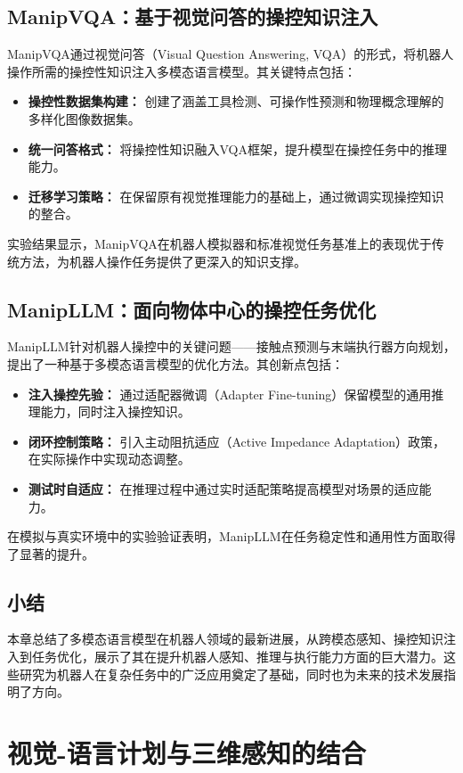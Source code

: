 \documentclass[a4paper]{article}
\begin{document}
\subsection{ManipVQA：基于视觉问答的操控知识注入}
ManipVQA通过视觉问答（Visual Question Answering, VQA）的形式，将机器人操作所需的操控性知识注入多模态语言模型。其关键特点包括：
\begin{itemize}
    \item \textbf{操控性数据集构建：} 创建了涵盖工具检测、可操作性预测和物理概念理解的多样化图像数据集。
    \item \textbf{统一问答格式：} 将操控性知识融入VQA框架，提升模型在操控任务中的推理能力。
    \item \textbf{迁移学习策略：} 在保留原有视觉推理能力的基础上，通过微调实现操控知识的整合。
\end{itemize}
实验结果显示，ManipVQA在机器人模拟器和标准视觉任务基准上的表现优于传统方法，为机器人操作任务提供了更深入的知识支撑。

\subsection{ManipLLM：面向物体中心的操控任务优化}
ManipLLM针对机器人操控中的关键问题——接触点预测与末端执行器方向规划，提出了一种基于多模态语言模型的优化方法。其创新点包括：
\begin{itemize}
    \item \textbf{注入操控先验：} 通过适配器微调（Adapter Fine-tuning）保留模型的通用推理能力，同时注入操控知识。
    \item \textbf{闭环控制策略：} 引入主动阻抗适应（Active Impedance Adaptation）政策，在实际操作中实现动态调整。
    \item \textbf{测试时自适应：} 在推理过程中通过实时适配策略提高模型对场景的适应能力。
\end{itemize}
在模拟与真实环境中的实验验证表明，ManipLLM在任务稳定性和通用性方面取得了显著的提升。

\subsection{小结}
本章总结了多模态语言模型在机器人领域的最新进展，从跨模态感知、操控知识注入到任务优化，展示了其在提升机器人感知、推理与执行能力方面的巨大潜力。这些研究为机器人在复杂任务中的广泛应用奠定了基础，同时也为未来的技术发展指明了方向。


\section{视觉-语言计划与三维感知的结合}
\end{document}
